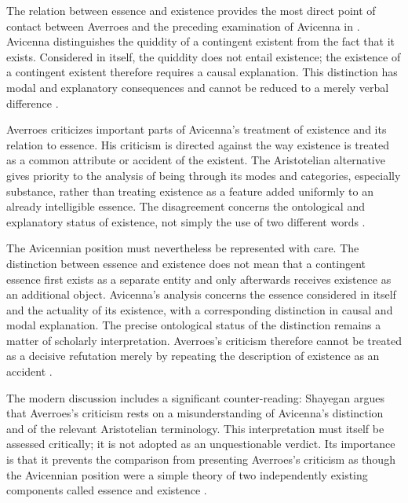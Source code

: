 The relation between essence and existence provides the
most direct point of contact between Averroes and the
preceding examination of Avicenna in
. Avicenna distinguishes the
quiddity of a contingent existent from the fact that it
exists. Considered in itself, the quiddity does not
entail existence; the existence of a contingent existent
therefore requires a causal explanation. This distinction
has modal and explanatory consequences and cannot be
reduced to a merely verbal difference
\citep{AvicennaMetaphysics,
BenAhmedPasnauIbnRushdSEP2025}.

\label{para:VS.B01.P01.C08.S15.SS08.P002}

Averroes criticizes important parts of Avicenna's treatment
of existence and its relation to essence. His criticism
is directed against the way existence is treated as a
common attribute or accident of the existent. The
Aristotelian alternative gives priority to the analysis
of being through its modes and categories, especially
substance, rather than treating existence as a feature
added uniformly to an already intelligible essence.
The disagreement concerns the ontological and explanatory
status of existence, not simply the use of two different
words
\citep{AverroesLongCommentaryMetaphysicsBouyges1990,
BertolacciAvicennaAverroesMetaphysics2007}.

\label{para:VS.B01.P01.C08.S15.SS08.P003}

The Avicennian position must nevertheless be represented
with care. The distinction between essence and existence
does not mean that a contingent essence first exists as
a separate entity and only afterwards receives existence
as an additional object. Avicenna's analysis concerns
the essence considered in itself and the actuality of
its existence, with a corresponding distinction in
causal and modal explanation. The precise ontological
status of the distinction remains a matter of scholarly
interpretation. Averroes's criticism therefore cannot
be treated as a decisive refutation merely by repeating
the description of existence as an accident
\citep{BeloEssenceExistenceAvicennaAverroes2009,
ShayeganAccidentalityExistence2017}.

\label{para:VS.B01.P01.C08.S15.SS08.P004}

The modern discussion includes a significant counter-reading:
Shayegan argues that Averroes's criticism rests on a
misunderstanding of Avicenna's distinction and of the
relevant Aristotelian terminology. This interpretation
must itself be assessed critically; it is not adopted
as an unquestionable verdict. Its importance is that
it prevents the comparison from presenting Averroes's
criticism as though the Avicennian position were a
simple theory of two independently existing components
called essence and existence
\citep{ShayeganAccidentalityExistence2017,
BeloEssenceExistenceAvicennaAverroes2009}.


